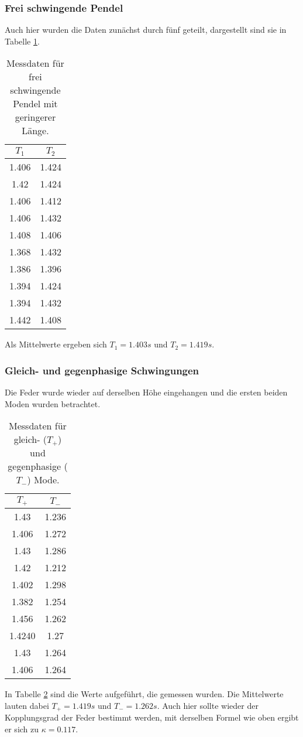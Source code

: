 \subsubsection{Frei schwingende Pendel}
Auch hier wurden die Daten zunächst durch fünf geteilt, dargestellt
sind sie in Tabelle \ref{tab:frei2}. 
\begin{table}
    \centering
    \caption{Messdaten für frei schwingende Pendel mit geringerer Länge.}
    \label{tab:frei2}
    \begin{tabular}{c c}
     \toprule
     $T_1$ & $T_2$\\
     \midrule
     1.406 & 1.424 \\
     1.42 & 1.424 \\
     1.406 & 1.412 \\
     1.406 & 1.432\\
     1.408 & 1.406 \\
     1.368 & 1.432 \\
     1.386 & 1.396 \\
     1.394 & 1.424 \\
     1.394 & 1.432 \\
     1.442 & 1.408 \\
     \bottomrule
    \end{tabular}
\end{table}
Als Mittelwerte ergeben sich $T_1 = 1.403 s$ und $T_2 = 1.419 s$.

\subsubsection{Gleich- und gegenphasige Schwingungen}
Die Feder wurde wieder auf derselben Höhe eingehangen und die ersten beiden Moden wurden betrachtet.
\begin{table}
    \centering
    \caption{Messdaten für gleich- ($T_{+}$) und gegenphasige ($T_{-}$) Mode.}
    \label{tab:g2}
    \begin{tabular}{c c}
     \toprule
     $T_{+}$ & $T_{-}$\\
     \midrule
     1.43 & 1.236 \\
     1.406& 1.272 \\
     1.43 & 1.286 \\
     1.42 & 1.212 \\
     1.402& 1.298 \\
     1.382 & 1.254 \\
     1.456 & 1.262 \\
     1.4240 & 1.27 \\
     1.43 & 1.264 \\
     1.406 & 1.264 \\
     \bottomrule
    \end{tabular}
\end{table}
In Tabelle \ref{tab:g2} sind die Werte aufgeführt, die gemessen wurden. Die Mittelwerte lauten dabei $T_{+} = 1.419s$ und $T_{-} = 1.262s$. Auch hier sollte wieder der Kopplungsgrad 
der Feder bestimmt werden, mit derselben Formel wie oben ergibt er sich zu $\kappa = 0.117$.

